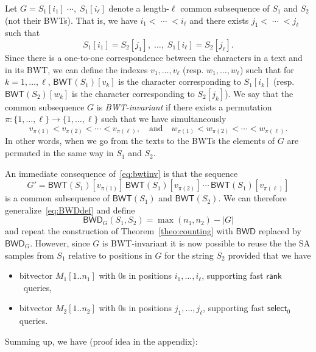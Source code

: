 \documentclass{llncs}
\newcommand{\BWD}
  {\ensuremath{\mathsf{BWD}}}
\newcommand{\BWT}
  {\ensuremath{\mathsf{BWT}}}
\newcommand{\rank}
  {\ensuremath{\mathsf{rank}}}
\newcommand{\select}
  {\ensuremath{\mathsf{select}}}
\begin{document}
Let
\(G = S_1[i_1]\;\cdots,\;S_1[i_\ell]\)
denote a length-$\ell$ common subsequence of $S_1$ and $S_2$ (not their
BWTs). That is, we have $i_1< \;\cdots\; < i_\ell$ and there exists $j_1 <
\;\cdots\; < j_\ell$ such that
$$
S_1[i_1]=S_2[j_1],\;\ldots,\;S_1[i_\ell]=S_2[j_\ell].
$$
Since there is a one-to-one correspondence between the characters in a text and in its BWT, we can
define the indexes $v_1, \ldots, v_\ell$ (resp. $w_1,\ldots,w_\ell$) such
that for $k=1,\ldots,\ell$, $\BWT(S_1)[v_k]$ is the character corresponding
to $S_1[i_k]$ (resp. $\BWT(S_2)[w_k]$ is the character corresponding to
$S_2[j_k]$). We say that the common subsequence $G$ is {\em BWT-invariant} if
there exists a permutation $\pi: \{1,\ldots,\ell\} \rightarrow
\{1,\ldots,\ell\}$ such that we have simultaneously
\begin{equation}\label{eq:bwtinv}
v_{\pi(1)} < v_{\pi(2)} < \cdots < v_{\pi(\ell)}, \quad\mbox{and}\quad
w_{\pi(1)} < w_{\pi(2)} < \cdots < w_{\pi(\ell)}.
\end{equation}
In other words, when we go from the texts to the BWTs the elements of $G$ are
permuted in the same way in $S_1$ and $S_2$.




An immediate consequence of~\eqref{eq:bwtinv} is that the sequence
$$
G' = \BWT(S_1)[v_{\pi(1)}]\,\BWT(S_1)[v_{\pi(2)}]\,\cdots\,\BWT(S_1)[v_{\pi(\ell)}]
$$
is a common subsequence of $\BWT(S_1)$ and $\BWT(S_2)$. We can therefore
generalize~\eqref{eq:BWDdef} and define
$$
\BWD_G(S_1, S_2) = \max(n_1,n_2) - |G|
$$
and repeat the construction of Theorem~\ref{theo:counting} with $\BWD$
replaced by $\BWD_G$. However, since $G$ is BWT-invariant it is now possible
to reuse the the SA samples from $S_1$ relative to positions in $G$ for the
string $S_2$ provided that we have
\begin{itemize}
\item bitvector \(M_1 [1..n_1]\) with 0s in positions  $i_1, \ldots, i_\ell$,
    supporting fast \rank\ queries,
\item bitvector \(M_2 [1..n_2]\) with 0s in positions $j_1, \ldots,
    j_\ell$, supporting fast $\select_0$ queries.
\end{itemize}
Summing up, we have (proof idea in the appendix):
\end{document}
